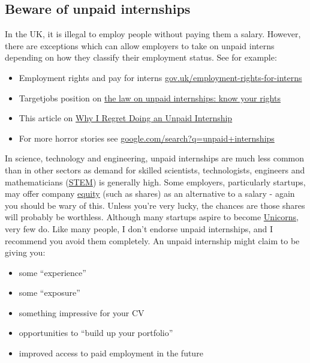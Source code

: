 \documentclass[
]{book}
\providecommand{\tightlist}{%
  \setlength{\itemsep}{0pt}\setlength{\parskip}{0pt}}
\begin{document}
\hypertarget{unpaid}{%
\subsection{Beware of unpaid internships}\label{unpaid}}

In the UK, it is illegal to employ people without paying them a salary. However, there are exceptions which can allow employers to take on unpaid interns depending on how they classify their employment status. See for example:

\begin{itemize}
\tightlist
\item
  Employment rights and pay for interns \href{https://www.gov.uk/employment-rights-for-interns}{gov.uk/employment-rights-for-interns}
\item
  Targetjobs position on \href{https://targetjobs.co.uk/internships/advice/275017-the-law-on-unpaid-internships-know-your-rights}{the law on unpaid internships: know your rights}
\item
  This article on \href{https://www.ratemyplacement.co.uk/blog/why-i-regret-doing-an-unpaid-internship/}{Why I Regret Doing an Unpaid Internship} \citep{louiseregret}
\item
  For more horror stories see \href{https://www.google.com/search?q=unpaid+internships}{google.com/search?q=unpaid+internships}
\end{itemize}

In science, technology and engineering, unpaid internships are much less common than in other sectors as demand for skilled scientists, technologists, engineers and mathematicians (\href{https://en.wikipedia.org/wiki/Science,_technology,_engineering,_and_mathematics}{STEM}) is generally high. Some employers, particularly startups, may offer company \href{https://en.wikipedia.org/wiki/Equity_(finance)}{equity} (such as shares) as an alternative to a salary - again you should be wary of this. Unless you're very lucky, the chances are those shares will probably be worthless. Although many startups aspire to become \href{https://en.wikipedia.org/wiki/Unicorn_(finance)}{Unicorns}, very few do. Like many people, I don't endorse unpaid internships, and I recommend you avoid them completely. An unpaid internship might claim to be giving you:

\begin{itemize}
\tightlist
\item
  some ``experience''
\item
  some ``exposure''
\item
  something impressive for your CV
\item
  opportunities to ``build up your portfolio''
\item
  improved access to paid employment in the future
\end{itemize}
\end{document}
